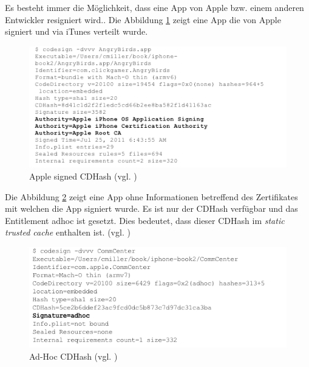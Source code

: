 Es besteht immer die Möglichkeit, dass eine App von Apple bzw. einem anderen Entwickler resigniert wird.\cite{Sign[1], Sign[2], Sign[3], Sign[4], Sign[5]}. Die Abbildung \ref{fig:Apple signed CDHash} zeigt eine App die von Apple signiert und via iTunes verteilt wurde.

\begin{figure}[!ht]
        \centering
        \includegraphics[scale=1.0]{AppleZert_CDHash.png}
        \caption{Apple signed CDHash (vgl. \cite{Hacking[1]})}
        \label{fig:Apple signed CDHash}
\end{figure}

Die Abbildung \ref{fig:Ad-Hoc CDHash} zeigt eine App ohne Informationen betreffend des Zertifikates mit welchen die App signiert wurde. Es ist nur der CDHash verfügbar und das Entitlement adhoc ist gesetzt. Dies bedeutet, dass dieser CDHash im \textit{\glqq static trusted cache\grqq{}} enthalten ist. (vgl. \cite{Sign[1], Sign[2], Sign[3], Sign[4], Sign[5]})

\begin{figure}[!ht]
        \centering
        \includegraphics[scale=0.9]{ADhoc_CDHash.png}
        \caption{Ad-Hoc CDHash (vgl. \cite{Hacking[1]})}
        \label{fig:Ad-Hoc CDHash}
\end{figure}

